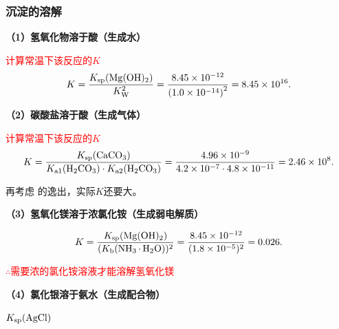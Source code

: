         \subsubsection{沉淀的溶解}\label{subsubsec:沉淀的溶解}

            \noindent\textbf{（1）氢氧化物溶于酸（生成水）}
            

            
            
            \textcolor{red}{计算常温下该反应的\(K\)}
            \[
                K = \frac{K_\text{sp}(\cemh{Mg(OH)2})}{K_\text{W}^2} = \frac{\num{8.45E-12}}{\left(\num{1.0E-14}\right)^2} = \num{8.45E16}
            .\]

            \noindent\textbf{（2）碳酸盐溶于酸（生成气体）}


            \textcolor{red}{计算常温下该反应的\(K\)}
            \[
                K = \frac{K_\text{sp}(\cemh{CaCO3})}{K_\text{a1}(\cemh{H2CO3})\cdot K_\text{a2}(\cemh{H2CO3})} = \frac{\num{4.96E-9}}{\num{4.2E-7}\cdot\num{4.8E-11}} = \num{2.46E8}
            .\]
            
            再考虑 的逸出，实际\(K\)还要大。

            \noindent\textbf{（3）氢氧化镁溶于浓氯化铵（生成弱电解质）}


            \[
                K = \frac{K_\text{sp}(\cemh{Mg(OH)2})}{(K_\text{b}(\cemh{NH3 . H2O}))^2} = \frac{\num{8.45E-12}}{(\num{1.8E-5})^2} = 0.026
            .\]

            \textcolor{red}{\(\therefore\)需要浓的氯化铵溶液才能溶解氢氧化镁}

            \noindent\textbf{（4）氯化银溶于氨水（生成配合物）}


             \(K_\text{sp}(\cemh{AgCl})\)

